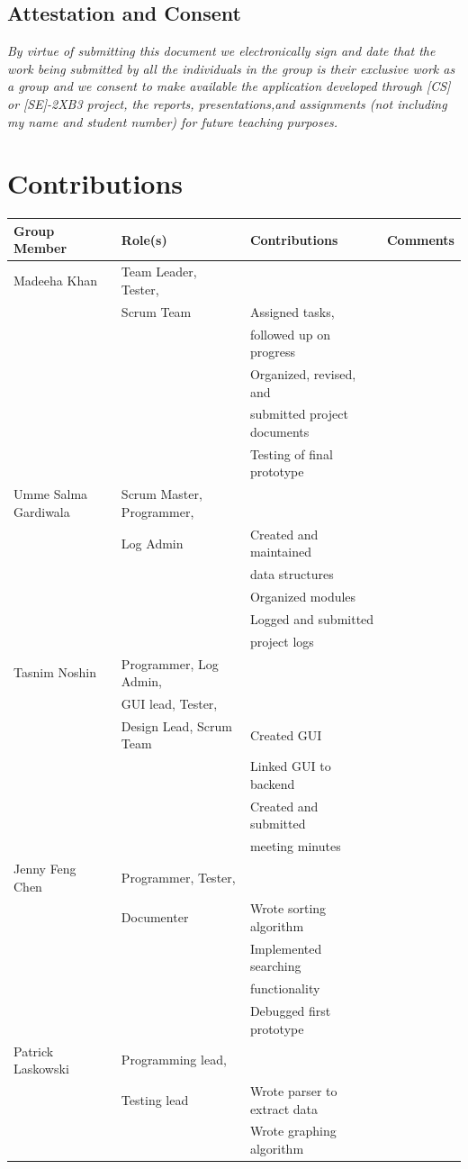 \documentclass[12pt,fleqn]{article}
\begin{document}
\subsection*{Attestation and Consent}
\textit{By virtue of submitting this document we electronically sign and date that the  work  being  submitted  by  all  the  individuals  in  the  group  is  their  exclusive work as a group and we consent to make available the application developed  through  [CS]  or  [SE]-2XB3  project,  the  reports,  presentations,and assignments (not including my name and student number) for future teaching purposes.}


\newpage
\section*{Contributions}\label{contributions}
\begin{tabular}{| l | l | l | l |}
\hline
\textbf{Group Member} & \textbf{Role(s)} & \textbf{Contributions} & \textbf{Comments}\\
\hline
Madeeha Khan & Team Leader, Tester, \\&Scrum Team & Assigned tasks, \\&&followed up on progress & ~\\
\hline
~ & ~ & Organized, revised, and \\&&submitted project documents & ~\\
\hline
~ & ~ & Testing of final prototype & ~\\
\hline
Umme Salma Gardiwala & Scrum Master, Programmer, \\&Log Admin & Created and maintained \\&&data structures & ~\\
\hline
~ & ~ & Organized modules & ~\\
\hline
~ &~ & Logged and submitted \\&&project logs & ~\\
\hline
Tasnim Noshin & Programmer, Log Admin, \\&GUI lead, Tester, \\&Design Lead, Scrum Team & Created GUI & ~\\
\hline
 & &Linked GUI to backend  & ~\\
\hline
 & & Created and submitted \\&&meeting minutes & ~\\
\hline
Jenny Feng Chen &Programmer, Tester, \\&Documenter  &  Wrote sorting algorithm& ~\\
\hline
 & &  Implemented searching \\&&functionality& ~\\
\hline
 & & Debugged first prototype & ~\\
\hline
 Patrick Laskowski& Programming lead, \\&Testing lead& Wrote parser to extract data & ~\\
\hline
 & &  Wrote graphing algorithm& ~\\
\hline
\end{tabular}
\end{document}
